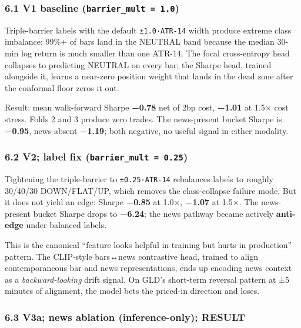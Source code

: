 \documentclass[
]{article}
\begin{document}
\subsubsection{\texorpdfstring{6.1 V1 baseline
(\texttt{barrier\_mult\ =\ 1.0})}{6.1 V1 baseline (barrier\_mult = 1.0)}}\label{v1-baseline-barrier_mult-1.0}

Triple-barrier labels with the default \texttt{±1.0·ATR-14} width
produce extreme class imbalance; 99\%+ of bars land in the NEUTRAL band
because the median 30-min log return is much smaller than one ATR-14.
The focal cross-entropy head collapses to predicting NEUTRAL on every
bar; the Sharpe head, trained alongside it, learns a near-zero position
weight that lands in the dead zone after the conformal floor zeros it
out.

Result: mean walk-forward Sharpe \textbf{−0.78} net of 2bp cost,
\textbf{−1.01} at 1.5× cost stress. Folds 2 and 3 produce zero trades.
The news-present bucket Sharpe is \textbf{−0.95}, news-absent
\textbf{−1.19}; both negative, no useful signal in either modality.

\subsubsection{\texorpdfstring{6.2 V2; label fix
(\texttt{barrier\_mult\ =\ 0.25})}{6.2 V2; label fix (barrier\_mult = 0.25)}}\label{v2-label-fix-barrier_mult-0.25}

Tightening the triple-barrier to \texttt{±0.25·ATR-14} rebalances labels
to roughly 30/40/30 DOWN/FLAT/UP, which removes the class-collapse
failure mode. But it does not yield an edge: Sharpe \textbf{−0.85} at
1.0×, \textbf{−1.07} at 1.5×. The news-present bucket Sharpe drops to
\textbf{−6.24}; the news pathway became actively \textbf{anti-edge}
under balanced labels.

This is the canonical ``feature looks helpful in training but hurts in
production'' pattern. The CLIP-style bars↔news contrastive head, trained
to align contemporaneous bar and news representations, ends up encoding
news context as a \emph{backward-looking} drift signal. On GLD's
short-term reversal pattern at ±5 minutes of alignment, the model bets
the priced-in direction and loses.

\subsubsection{6.3 V3a; news ablation (inference-only);
RESULT}\label{v3a-news-ablation-inference-only-result}
\end{document}
